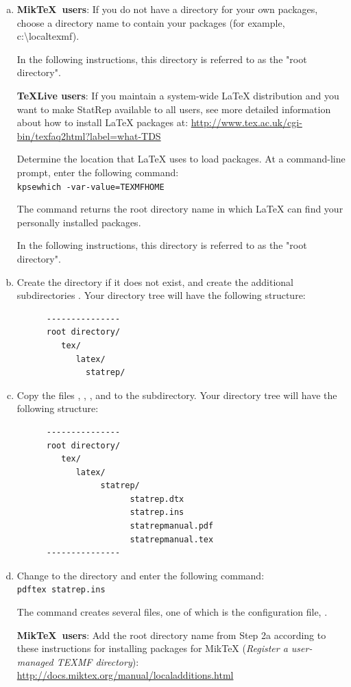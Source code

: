 \documentclass[article,oneside]{memoir}
\begin{document}
  \begin{enumerate}[a)]
   \item
   \textbf{Mik\TeX\ users}: If you do not have a directory for your own
   packages, choose a directory name to contain your packages
   (for example, c:\textbackslash{}localtexmf).

   In the following instructions, this directory is referred to as the
   "root directory".

   \textbf{\TeX{}Live users}:
   If you maintain a system-wide LaTeX distribution and you want to
      make StatRep available to all users, see more detailed information
      about how to install LaTeX packages at:
      \url{http://www.tex.ac.uk/cgi-bin/texfaq2html?label=what-TDS}

   Determine the location that LaTeX uses to load packages. At a
   command-line prompt, enter the following command:\\
   \texttt{kpsewhich -var-value=TEXMFHOME}

   The command returns the root directory name in which LaTeX can
   find your personally installed packages.

    In the following instructions, this directory is referred to as the
    "root directory".

   \item
   Create the directory if it does not exist, and create the additional
   subdirectories .
   Your directory tree will have the following structure:
\begin{verbatim}
      ---------------
      root directory/
         tex/
            latex/
              statrep/
\end{verbatim}
  \item
   Copy the files , , ,
   and  to
   the  subdirectory. Your directory tree will have the following structure:
\begin{verbatim}
      ---------------
      root directory/
         tex/
            latex/
                 statrep/
                       statrep.dtx
                       statrep.ins
                       statrepmanual.pdf
                       statrepmanual.tex
      ---------------
\end{verbatim}
   \item
   Change to the  directory and enter the following command:\\
   \texttt{pdftex statrep.ins}

   The command creates several files, one of which is the configuration
   file, .

   \textbf{Mik\TeX\ users}:
   Add the root directory name from Step 2a according to these instructions
   for installing packages for MikTeX
   (\textit{Register a user-managed TEXMF directory}):
   \url{http://docs.miktex.org/manual/localadditions.html}

\end{enumerate}
\end{document}
